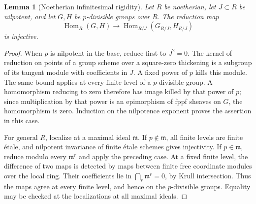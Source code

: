 \documentclass[11pt]{article}
\newtheorem{lemma}[theorem]{Lemma}
\theoremstyle{definition}\newtheorem{definition}[theorem]{Definition}
\theoremstyle{remark}\newtheorem{remark}[theorem]{Remark}
\newcommand{\Hom}{\operatorname{Hom}}
\begin{document}
\begin{lemma}[Noetherian infinitesimal rigidity]\label{lem:rigidity}
Let $R$ be noetherian, let $J\subset R$ be nilpotent, and let $G,H$ be $p$-divisible groups over $R$. The reduction map
\[
 \Hom_R(G,H)\longrightarrow\Hom_{R/J}(G_{R/J},H_{R/J})
\]
is injective.
\end{lemma}
\begin{proof}
When $p$ is nilpotent in the base, reduce first to $J^2=0$. The kernel of reduction on points of a group scheme over a square-zero thickening is a subgroup of its tangent module with coefficients in $J$. A fixed power of $p$ kills this module. The same bound applies at every finite level of a $p$-divisible group. A homomorphism reducing to zero therefore has image killed by that power of $p$; since multiplication by that power is an epimorphism of fppf sheaves on $G$, the homomorphism is zero. Induction on the nilpotence exponent proves the assertion in this case.

For general $R$, localize at a maximal ideal $\mathfrak m$. If $p\notin\mathfrak m$, all finite levels are finite \'etale, and nilpotent invariance of finite \'etale schemes gives injectivity. If $p\in\mathfrak m$, reduce modulo every $\mathfrak m^r$ and apply the preceding case. At a fixed finite level, the difference of two maps is detected by maps between finite free coordinate modules over the local ring. Their coefficients lie in $\bigcap_r\mathfrak m^r=0$, by Krull intersection. Thus the maps agree at every finite level, and hence on the $p$-divisible groups. Equality may be checked at the localizations at all maximal ideals.
\end{proof}
\end{document}
